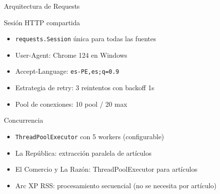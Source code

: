 \documentclass[11pt,aspectratio=169,spanish]{beamer}
\begin{document}
\begin{frame}{Arquitectura de Requests}
    \begin{block}{Sesión HTTP compartida}
        \begin{itemize}
            \item \texttt{requests.Session} única para todas las fuentes
            \item User-Agent: Chrome 124 en Windows
            \item Accept-Language: \texttt{es-PE,es;q=0.9}
            \item Estrategia de retry: 3 reintentos con backoff 1s
            \item Pool de conexiones: 10 pool / 20 max
        \end{itemize}
    \end{block}

    \vspace{0.3cm}
    \begin{block}{Concurrencia}
        \begin{itemize}
            \item \texttt{ThreadPoolExecutor} con 5 workers (configurable)
            \item La República: extracción paralela de artículos
            \item El Comercio y La Razón: ThreadPoolExecutor para artículos
            \item Arc XP RSS: procesamiento secuencial (no se necesita por artículo)
        \end{itemize}
    \end{block}
\end{frame}
\end{document}
